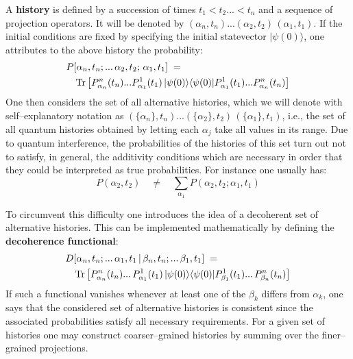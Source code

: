 \documentclass[10pt,a4paper]{article}
\begin{document}
A {\bf history} is defined by a succession of times $t_{1} < t_{2}
... < t_{n}$ and a sequence of projection operators. It will be
denoted by $(\alpha_{n},t_{n}) ... (\alpha_{2},t_{2})\,
(\alpha_{1},t_{1})$. If the initial conditions are fixed by
specifying the initial statevector $|\psi(0)\rangle$, one
attributes to the above history the probability:
\begin{eqnarray}
\lefteqn{P[\alpha_{n},t_{n}; ... \,\alpha_{2},t_{2};\,
\alpha_{1},t_{1}] \; = \;} \nonumber \\ && \makebox{Tr} \left[
P^{n}_{\alpha_{n}}(t_{n}) ...
P^{1}_{\alpha_{1}}(t_{1})\,|\psi(0)\rangle\langle\psi(0)|
P^{1}_{\alpha_{1}}(t_{1})... P^{n}_{\alpha_{n}}(t_{n})\right]
\end{eqnarray}
One then considers the set of all alternative histories, which we
will denote with self--explanatory notation as
$(\{\alpha_{n}\},t_{n}) ... (\{\alpha_{2}\},t_{2})\,
(\{\alpha_{1}\},t_{1})$, i.e., the set of all quantum histories
obtained by letting each $\alpha_{j}$ take all values in its
range. Due to quantum interference, the probabilities of the
histories of this set turn out not to satisfy, in general, the
additivity conditions which are necessary in order that they could
be interpreted as true probabilities. For instance one usually
has:
\begin{equation}
P(\alpha_{2}, t_{2}) \quad \neq \quad \sum_{\alpha_{1}}
P(\alpha_{2}, t_{2}; \alpha_{1}, t_{1})
\end{equation}

To circumvent this difficulty one introduces the idea of a
decoherent set of alternative histories. This can be implemented
mathematically by defining the {\bf decoherence functional}:
\begin{eqnarray}
\lefteqn{D[\alpha_{n},t_{n}; ...\, \alpha_{1},t_{1}\, |\,
\beta_{n},t_{n}; ...\, \beta_{1},t_{1}]
\; = \;} \nonumber \\
& & \makebox{Tr} \left[ P^{n}_{\alpha_{n}}(t_{n}) ...\,
P^{1}_{\alpha_{1}}(t_{1})\,|\psi(0)\rangle\langle\psi(0)|
P^{1}_{\beta_{1}}(t_{1})...\, P^{n}_{\beta_{n}}(t_{n})\right]
\end{eqnarray}
If such a functional vanishes whenever at least one of the
$\beta_{k}$ differs from $\alpha_{k}$, one says that the
considered set of alternative histories is consistent since the
associated probabilities satisfy all necessary requirements. For a
given set of histories one may construct coarser--grained
histories by summing over the finer--grained projections.
\end{document}
